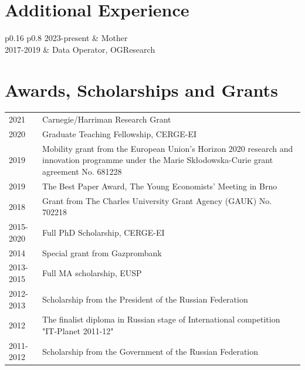 \documentclass[letterpaper]{article}
\begin{document}
\vspace{+0.1cm}
\section*{Additional Experience}
\vspace{-0.5cm}
\noindent {\color{grey} \rule{\linewidth}{0.1mm}}
\begin{tabular}{ p{0.16\textwidth} p{0.8\textwidth}  }
2023-present & Mother \\
2017-2019 & Data Operator, OGResearch
\end{tabular}

\section*{Awards, Scholarships and Grants}
\vspace{-0.5cm}
\noindent {\color{grey} \rule{\linewidth}{0.1mm}}
\begin{tabular}{ p{} p{}  }
 2021 & Carnegie/Harriman Research Grant \\
 2020 & Graduate Teaching Fellowship, CERGE-EI \\
 2019 & Mobility grant from the European Union’s Horizon 2020 research and innovation programme under the Marie Skłodowska-Curie grant agreement No. 681228 \\
 2019 & The Best Paper Award, The Young Economists' Meeting in Brno\\
 2018 & Grant from The Charles University Grant Agency (GAUK) No. 702218\\
 2015-2020 & Full PhD Scholarship, CERGE-EI \\
 2014 & Special grant from Gazprombank \\
 2013-2015 & Full MA scholarship, EUSP \\
 2012-2013 & Scholarship from the President of the Russian Federation \\
 2012 & The finalist diploma in Russian stage of International competition "IT-Planet 2011-12" \\
 2011-2012 & Scholarship from the Government of the Russian Federation
\end{tabular}

\vspace{+0.1cm}
\end{document}

